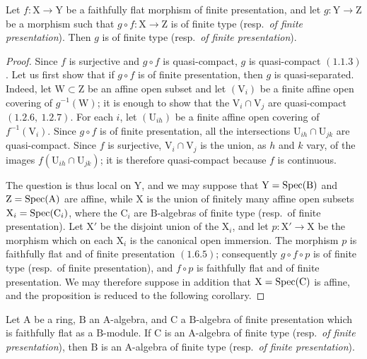\begin{proposition}[11.3.16]
\label{IV.11.3.16}
Let $f:\mathrm{X}\to\mathrm{Y}$ be a faithfully flat morphism of finite presentation, and let $g:\mathrm{Y}\to\mathrm{Z}$ be a morphism such that $g\circ f:\mathrm{X}\to\mathrm{Z}$ is of finite type \textup{(resp.\ \emph{of finite presentation})}. Then $g$ is of finite type \textup{(resp.\ \emph{of finite presentation})}.
\end{proposition}

\begin{proof}
Since $f$ is surjective and $g\circ f$ is quasi-compact, $g$ is quasi-compact $(1.1.3)$. Let us first show that if $g\circ f$ is of finite presentation, then $g$ is quasi-separated. Indeed, let $\mathrm{W}\subset\mathrm{Z}$ be an affine open subset and let $(\mathrm{V}_i)$ be a finite affine open covering of $g^{-1}(\mathrm{W})$; it is enough to show that the $\mathrm{V}_i\cap\mathrm{V}_j$ are quasi-compact $(1.2.6,\ 1.2.7)$. For each $i$, let $(\mathrm{U}_{ih})$ be a finite affine open covering of $f^{-1}(\mathrm{V}_i)$. Since $g\circ f$ is of finite presentation, all the intersections $\mathrm{U}_{ih}\cap\mathrm{U}_{jk}$ are quasi-compact. Since $f$ is surjective, $\mathrm{V}_i\cap\mathrm{V}_j$ is the union, as $h$ and $k$ vary, of the images $f(\mathrm{U}_{ih}\cap\mathrm{U}_{jk})$; it is therefore quasi-compact because $f$ is continuous.

The question is thus local on $\mathrm{Y}$, and we may suppose that $\mathrm{Y}=\operatorname{Spec}(\mathrm{B})$ and $\mathrm{Z}=\operatorname{Spec}(\mathrm{A})$ are affine, while $\mathrm{X}$ is the union of finitely many affine open subsets $\mathrm{X}_i=\operatorname{Spec}(\mathrm{C}_i)$, where the $\mathrm{C}_i$ are $\mathrm{B}$-algebras of finite type (resp.\ of finite presentation). Let $\mathrm{X}'$ be the disjoint union of the $\mathrm{X}_i$, and let $p:\mathrm{X}'\to\mathrm{X}$ be the morphism which on each $\mathrm{X}_i$ is the canonical open immersion. The morphism $p$ is faithfully flat and of finite presentation $(1.6.5)$; consequently $g\circ f\circ p$ is of finite type (resp.\ of finite presentation), and $f\circ p$ is faithfully flat and of finite presentation. We may therefore suppose in addition that $\mathrm{X}=\operatorname{Spec}(\mathrm{C})$ is affine, and the proposition is reduced to the following corollary.
\end{proof}

\begin{corollary}[11.3.17]
\label{IV.11.3.17}
Let $\mathrm{A}$ be a ring, $\mathrm{B}$ an $\mathrm{A}$-algebra, and $\mathrm{C}$ a $\mathrm{B}$-algebra of finite presentation which is faithfully flat as a $\mathrm{B}$-module. If $\mathrm{C}$ is an $\mathrm{A}$-algebra of finite type \textup{(resp.\ \emph{of finite presentation})}, then $\mathrm{B}$ is an $\mathrm{A}$-algebra of finite type \textup{(resp.\ \emph{of finite presentation})}.
\end{corollary}

